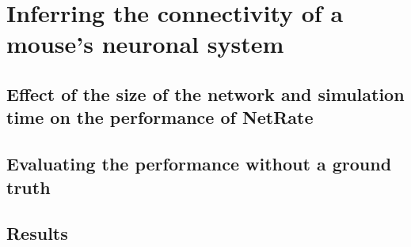 
\chapter{Inferring the connectivity of a mouse's neuronal system}
\section{Effect of the size of the network and simulation time on the performance of NetRate}
\section{Evaluating the performance without a ground truth}
\section{Results}
